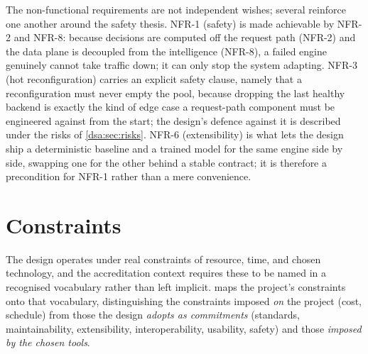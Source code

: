 The non-functional requirements are not independent wishes; several reinforce one
another around the safety thesis. NFR-1 (safety) is made achievable by NFR-2 and
NFR-8: because decisions are computed off the request path (NFR-2) and the data plane
is decoupled from the intelligence (NFR-8), a failed engine genuinely cannot take
traffic down; it can only stop the system adapting. NFR-3 (hot reconfiguration)
carries an explicit safety clause, namely that a reconfiguration must never empty the
pool, because dropping the last healthy backend is exactly the kind of edge case a
request-path component must be engineered against from the start; the design's
defence against it is described under the risks of \cref{dsa:sec:risks}. NFR-6
(extensibility) is what lets the design ship a deterministic baseline and a trained
model for the same engine side by side, swapping one for the other behind a stable
contract; it is therefore a precondition for NFR-1 rather than a mere convenience.

\section{Constraints}
\label{dsa:sec:constraints}

The design operates under real constraints of resource, time, and chosen technology,
and the accreditation context \cite{abet2025criteria} requires these to be named in a
recognised vocabulary rather than left implicit.  maps the
project's constraints onto that vocabulary, distinguishing the constraints imposed
\emph{on} the project (cost, schedule) from those the design \emph{adopts as
commitments} (standards, maintainability, extensibility, interoperability, usability,
safety) and those \emph{imposed by the chosen tools}.

